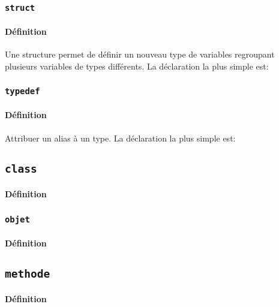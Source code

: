 \documentclass{article}
\begin{document}
\subsubsection{\texttt{struct}}
\paragraph{Définition}Une structure permet de définir un nouveau type de variables regroupant plusieurs variables de types différents. La déclaration la plus simple est:
\begin{scriptsize}
    \myStyleCPP
    
\end{scriptsize}

\subsubsection{\texttt{typedef}}
\paragraph{Définition}Attribuer un alias à un type. La déclaration la plus simple est:
\begin{scriptsize}
    \myStyleCPP
    
\end{scriptsize}

\subsection{\texttt{class}}
\paragraph{Définition}

\subsubsection{\texttt{objet}}
\paragraph{Définition}

\subsection{\texttt{methode}}
\paragraph{Définition}
\end{document}
